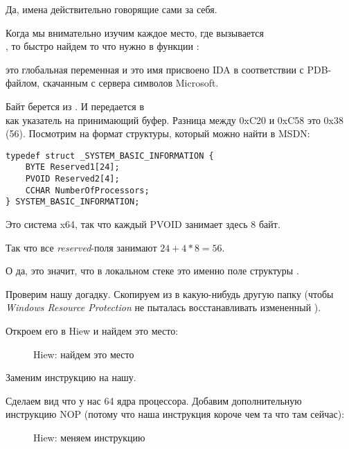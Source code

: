 Да, имена действительно говорящие сами за себя.

Когда мы внимательно изучим каждое место, где вызывается\\
,
то быстро найдем то что нужно в функции :%



 это глобальная переменная и это имя присвоено IDA в соответствии с \gls{PDB}-файлом,
скачанным с сервера символов Microsoft.

Байт берется из . 
И  передается в\\
как указатель на принимающий буфер.
Разница между 0xC20 и 0xC58 это 0x38 (56).
Посмотрим на формат структуры, который можно найти в MSDN:

\begin{lstlisting}[style=customc]
typedef struct _SYSTEM_BASIC_INFORMATION {
    BYTE Reserved1[24];
    PVOID Reserved2[4];
    CCHAR NumberOfProcessors;
} SYSTEM_BASIC_INFORMATION;
\end{lstlisting}

Это система x64, так что каждый PVOID занимает здесь 8 байт.

Так что все \emph{reserved}-поля занимают $24+4*8=56$.

О да, это значит, что  в локальном стеке это именно поле
 структуры .

Проверим нашу догадку.
Скопируем  из  
в какую-нибудь другую папку 
(чтобы \emph{Windows Resource Protection} не пыталась восстанавливать измененный ).

Откроем его в Hiew и найдем это место:

\begin{figure}[H]
\centering
{}
\caption{Hiew: найдем это место}
\end{figure}

Заменим инструкцию  на нашу.

Сделаем вид что у нас 64 ядра процессора.
Добавим дополнительную инструкцию \ac{NOP} (потому что наша инструкция короче чем та что там сейчас):

\begin{figure}[H]
\centering
{}
\caption{Hiew: меняем инструкцию}
\end{figure}


